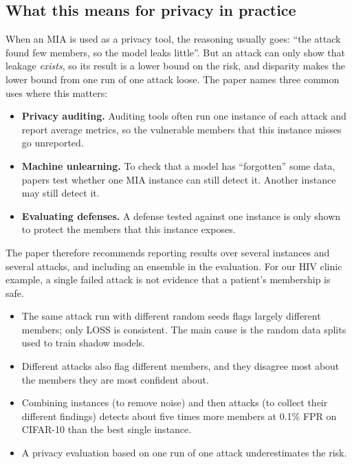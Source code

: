 \documentclass[a4paper]{article}
\begin{document}
\subsection{What this means for privacy in practice}
\label{subsec:implications}

When an MIA is used as a privacy tool, the reasoning usually goes: ``the attack found few members, so the model leaks little''.
But an attack can only show that leakage \emph{exists}, so its result is a lower bound on the risk, and disparity makes the lower bound from one run of one attack loose.
The paper names three common uses where this matters:
\begin{itemize}
  \item \textbf{Privacy auditing.} Auditing tools often run one instance of each attack and report average metrics, so the vulnerable members that this instance misses go unreported.
  \item \textbf{Machine unlearning.} To check that a model has ``forgotten'' some data, papers test whether one MIA instance can still detect it. Another instance may still detect it.
  \item \textbf{Evaluating defenses.} A defense tested against one instance is only shown to protect the members that this instance exposes.
\end{itemize}
The paper therefore recommends reporting results over several instances and several attacks, and including an ensemble in the evaluation.
For our HIV clinic example, a single failed attack is not evidence that a patient's membership is safe.

\begin{keypoints}
\begin{itemize}
  \item The same attack run with different random seeds flags largely different members; only LOSS is consistent. The main cause is the random data splits used to train shadow models.
  \item Different attacks also flag different members, and they disagree most about the members they are most confident about.
  \item Combining instances (to remove noise) and then attacks (to collect their different findings) detects about five times more members at 0.1\% FPR on CIFAR-10 than the best single instance.
  \item A privacy evaluation based on one run of one attack underestimates the risk.
\end{itemize}
\end{keypoints}
\end{document}
